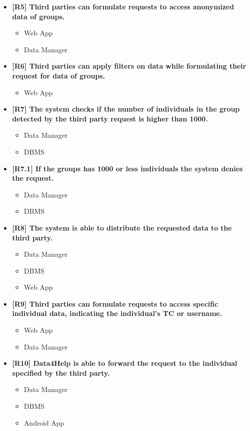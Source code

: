 \begin{itemize}
\item \textbf{[R5] Third parties can formulate requests to access anonymized data of groups.}
\begin{itemize}
\item Web App
\item Data Manager
\end{itemize}

\item \textbf{[R6] Third parties can apply filters on data while formulating their request for data of groups.}
\begin{itemize}
\item Web App
\end{itemize}


\item \textbf{[R7] The system checks if the number of individuals in the group detected by the third party request is higher than 1000.}
\begin{itemize}
\item Data Manager
\item DBMS
\end{itemize}


\item \textbf{[R7.1] If the groups has 1000 or less individuals the system denies the request.}
\begin{itemize}
\item Data Manager
\item DBMS
\end{itemize}


\item \textbf{[R8] The system is able to distribute the requested data to the third party.}
\begin{itemize}
\item Data Manager
\item DBMS
\item Web App
\end{itemize}

\item \textbf{[R9] Third parties can formulate requests to access specific individual data, indicating the individual’s TC or username.}
\begin{itemize}
\item Web App
\item Data Manager
\end{itemize}

\item \textbf{[R10] Data4Help is able to forward the request to the individual specified by the third party.}
\begin{itemize}
\item Data Manager
\item DBMS
\item Android App
\end{itemize}


\end{itemize}
